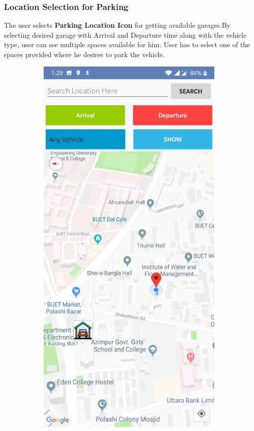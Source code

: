 \documentclass[12pt, english]{article}
\begin{document}
\subsubsection{Location Selection for Parking}
The user selects \textbf{Parking Location Icon} for getting available garages.By selecting desired garage with Arrival and Departure time along with the vehicle type, user can see multiple spaces available for him. User has to select one of the spaces provided where he desires to park the vehicle.
\newpage
\begin{figure}[h!]
    \centering
    \begin{subfigure}[t]{0.3\textwidth}
    \includegraphics[width=\linewidth]{Location_Selection/search_for_parkinglocations.jpg}

\end{subfigure}
\end{figure}
\end{document}
